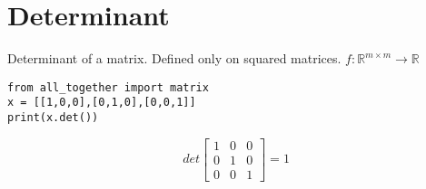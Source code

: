 \documentclass{article}
\begin{document}
\section{Determinant}
Determinant of a matrix. Defined only on squared matrices. \(f: \mathbb{R}^{m\times m} \rightarrow \mathbb{R}\)
\begin{lstlisting}
from all_together import matrix
x = [[1,0,0],[0,1,0],[0,0,1]]
print(x.det()) 
\end{lstlisting}
\begin{equation}
    det \left[
    \begin{array}{ccc}
        1 & 0 &0 \\
        0 &1&0 \\
        0&0&1 
    \end{array}
    \right] = 1
\end{equation}
\end{document}
